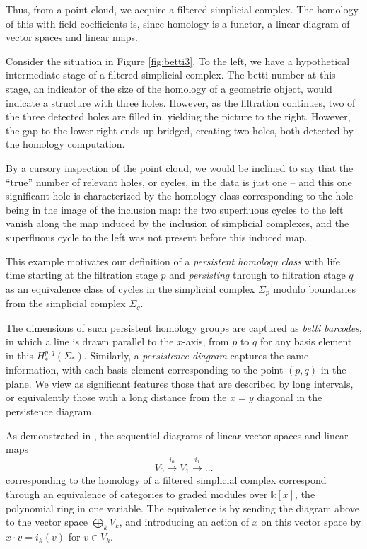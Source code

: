 \documentclass[10pt]{article}
\begin{document}
Thus, from a point cloud, we acquire a filtered simplicial
complex. The homology of this with field coefficients is, since
homology is a functor, a linear diagram of vector spaces and linear
maps. 

Consider the situation in Figure \ref{fig:betti3}. To the left, we
have a hypothetical intermediate stage of a filtered simplicial
complex. The betti number at this stage, an indicator of the size of
the homology of a geometric object, would indicate a structure with
three holes. However, as the filtration continues, two of the three
detected holes are filled in, yielding the picture to the
right. However, the gap to the lower right ends up bridged, creating
two holes, both detected by the homology computation.

By a cursory inspection of the point cloud, we would be inclined to
say that the ``true'' number of relevant holes, or cycles, in the data
is just one -- and this one significant hole is characterized by the
homology class corresponding to the hole being in the image of the
inclusion map: the two superfluous cycles to the left vanish along the
map induced by the inclusion of simplicial complexes, and the
superfluous cycle to the left was not present before this induced
map.

This example motivates our definition of a \emph{persistent homology class}
with life time starting at the filtration stage $p$ and
\emph{persisting} through to filtration stage $q$ as an equivalence
class of cycles in the simplicial complex $\Sigma_p$ modulo boundaries
from the simplicial complex $\Sigma_q$.


The dimensions of such persistent homology groups are captured as
\emph{betti barcodes}, in which a line is drawn parallel to the
$x$-axis, from $p$ to $q$ for any basis element in this
$H^{p,q}_*(\Sigma_*)$. Similarly, a \emph{persistence diagram}
captures the same information, with each basis element corresponding
to the point $(p,q)$ in the plane. We view as significant features
those that are described by long intervals, or equivalently those with
a long distance from the $x=y$ diagonal in the persistence diagram.

As demonstrated in \cite{Carlsson_04}, the sequential diagrams of
linear vector spaces and linear maps
\[
V_0 \xrightarrow{i_0} V_1 \xrightarrow{i_1} \dots 
\]
corresponding to the homology of a filtered simplicial complex
correspond through an equivalence of categories to graded modules over
$\mathbb k[x]$, the polynomial ring in one variable. The equivalence
is by sending the diagram above to the vector space $\bigoplus_k V_k$,
and introducing an action of $x$ on this vector space by $x\cdot v=i_k(v)$
for $v\in V_k$.
\end{document}
